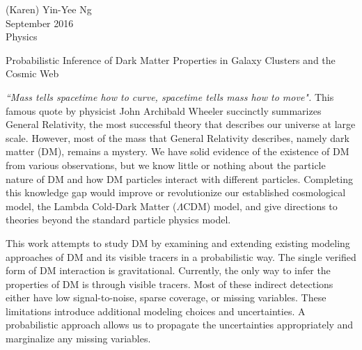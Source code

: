 \documentclass[ucdthesis.tex]{subfiles}
\begin{document}

    \doublespacing
		\begin{flushright}
			(Karen) Yin-Yee Ng \\
			September 2016 \\
			Physics \\
		\end{flushright}

		\begin{center}
			Probabilistic Inference of Dark Matter Properties in Galaxy Clusters and
			the Cosmic Web\\
		\end{center}

		{\it ``Mass tells spacetime how to curve, spacetime tells mass how to move".}
		This famous quote by physicist John Archibald Wheeler succinctly summarizes General
		Relativity,  the most successful theory that describes our universe
		at large scale. However, most of the mass that General Relativity describes,
		namely dark matter (DM), remains a mystery.  
		We have solid evidence of the existence of DM from various
		observations, but we know little or nothing about the particle nature of DM
		and how DM particles interact with different particles. 
		Completing this knowledge gap would improve or 
		revolutionize our established cosmological model,
		the Lambda Cold-Dark Matter	($\Lambda$CDM) model, 
		and give directions to theories beyond the standard particle
		physics model. 

			This work attempts to study DM by examining and
		extending existing modeling approaches of DM and its visible tracers in a
		probabilistic way. The single verified form of 
		DM interaction is gravitational. Currently, the 
		only way to infer the properties of DM is through visible tracers. Most of 
		these indirect detections	either have low signal-to-noise, sparse coverage, 
		or missing
		variables. These limitations introduce additional
		modeling choices and uncertainties. A probabilistic approach allows us to
		propagate the uncertainties appropriately and marginalize any 
		missing variables. 	
		
\end{document}
